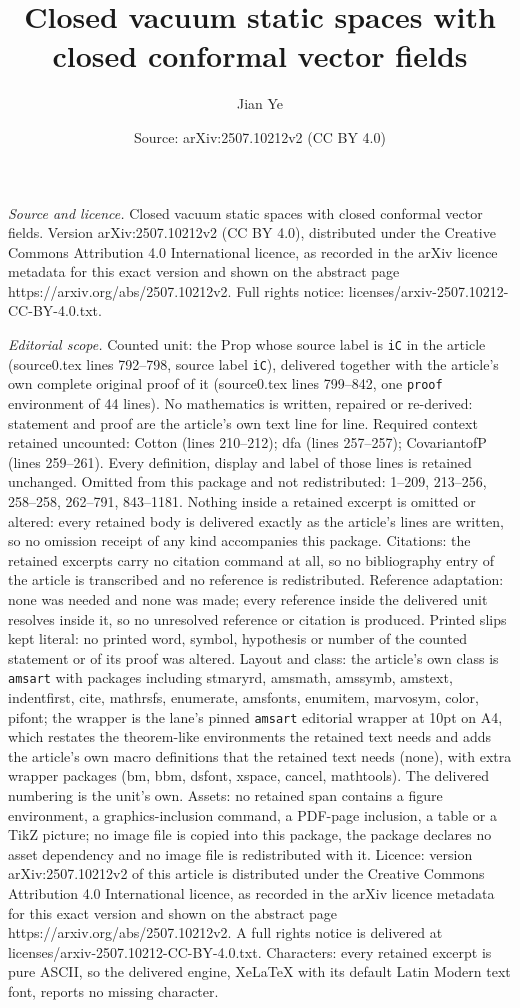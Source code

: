 \documentclass[10pt,a4paper]{amsart}
\title[Closed vacuum static spaces with closed conformal vector fie]{Closed vacuum static spaces with closed conformal vector fields}
\author{Jian Ye}
\date{Source: arXiv:2507.10212v2 (CC BY 4.0)}
\begin{document}
\maketitle

\noindent\emph{Source and licence.} Closed vacuum static spaces with closed conformal vector fields. Version arXiv:2507.10212v2 (CC BY 4.0), distributed under the Creative Commons Attribution 4.0 International licence, as recorded in the arXiv licence metadata for this exact version and shown on the abstract page https://arxiv.org/abs/2507.10212v2. Full rights notice: licenses/arxiv-2507.10212-CC-BY-4.0.txt.\par\smallskip

\noindent\textit{Editorial scope.} Counted unit: the Prop whose source label is \texttt{iC} in the article (source0.tex lines 792--798, source label \texttt{iC}), delivered together with the article's own complete original proof of it (source0.tex lines 799--842, one \texttt{proof} environment of 44 lines). No mathematics is written, repaired or re-derived: statement and proof are the article's own text line for line. Required context retained uncounted: Cotton (lines 210--212); dfa (lines 257--257); CovariantofP (lines 259--261). Every definition, display and label of those lines is retained unchanged. Omitted from this package and not redistributed: 1--209, 213--256, 258--258, 262--791, 843--1181. Nothing inside a retained excerpt is omitted or altered: every retained body is delivered exactly as the article's lines are written, so no omission receipt of any kind accompanies this package. Citations: the retained excerpts carry no citation command at all, so no bibliography entry of the article is transcribed and no reference is redistributed. Reference adaptation: none was needed and none was made; every reference inside the delivered unit resolves inside it, so no unresolved reference or citation is produced. Printed slips kept literal: no printed word, symbol, hypothesis or number of the counted statement or of its proof was altered. Layout and class: the article's own class is \texttt{amsart} with packages including stmaryrd, amsmath, amssymb, amstext, indentfirst, cite, mathrsfs, enumerate, amsfonts, enumitem, marvosym, color, pifont; the wrapper is the lane's pinned \texttt{amsart} editorial wrapper at 10pt on A4, which restates the theorem-like environments the retained text needs and adds the article's own macro definitions that the retained text needs (none), with extra wrapper packages (bm, bbm, dsfont, xspace, cancel, mathtools). The delivered numbering is the unit's own. Assets: no retained span contains a figure environment, a graphics-inclusion command, a PDF-page inclusion, a table or a TikZ picture; no image file is copied into this package, the package declares no asset dependency and no image file is redistributed with it. Licence: version arXiv:2507.10212v2 of this article is distributed under the Creative Commons Attribution 4.0 International licence, as recorded in the arXiv licence metadata for this exact version and shown on the abstract page https://arxiv.org/abs/2507.10212v2. A full rights notice is delivered at licenses/arxiv-2507.10212-CC-BY-4.0.txt. Characters: every retained excerpt is pure ASCII, so the delivered engine, XeLaTeX with its default Latin Modern text font, reports no missing character.
\end{document}
